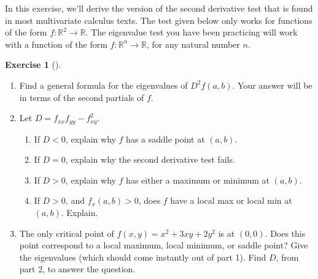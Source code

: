 \documentclass[10pt,]{book}
\theoremstyle{plain}
\theoremstyle{definition}
\theoremstyle{definition}
\theoremstyle{definition}
\theoremstyle{definition}
\newtheorem{exploration}[project]{Exercise}
\theoremstyle{definition}
\numberwithin{equation}{section}
\newcommand{\lt}{<}
\begin{document}
In this exercise, we'll derive the version of the second derivative test that is found in most multivariate calculus texts. The test given below only works for functions of the form \(f:\mathbb{R}^2\to\mathbb{R}\). The eigenvalue test you have been practicing will work with a function of the form \(f:\mathbb{R}^n\to\mathbb{R}\), for any natural number \(n\).%
\begin{exploration}[]\label{exploration-240}
\leavevmode%
\begin{enumerate}[font=\bfseries,label=(\alph*),ref=\alph*]
\item\label{task-643} Find a general formula for the eigenvalues of \(D^2f(a,b)\). Your answer will be in terms of the second partials of \(f\).%
\item\label{task-644} Let \(D=f_{xx}f_{yy}-f_{xy}^2\). \leavevmode%
\begin{itemize}[label=\textbullet]
\begin{enumerate}[font=\bfseries,label=(\alph*),ref=\alph*]
\item\label{task-645} If \(D\lt 0\), explain why \(f\) has a saddle point at \((a,b)\).%
\item\label{task-646} If \(D=0\), explain why the second derivative test fails.%
\item\label{task-647} If \(D>0\), explain why \(f\) has either a maximum or minimum at \((a,b)\).%
\item\label{task-648} If \(D>0\), and \(f_x(a,b)>0\), does \(f\) have a local max or local min at \((a,b)\). Explain.%
\end{enumerate}
\end{itemize}
%
\item\label{task-649} The only critical point of \(f(x,y) = x^2+3xy+2y^2\) is at \((0,0)\).  Does this point correspond to a local maximum, local minimum, or saddle point? Give the eigenvalues (which should come instantly out of part 1). Find \(D\), from part 2, to answer the question.%
\end{enumerate}
\end{exploration}
\typeout{************************************************}
\typeout{************************************************}
\end{document}
